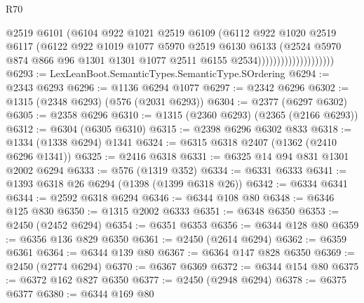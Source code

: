 \begin{lexlean}{R70}
\begin{coremodule}
                                    @2519
                                    @6101
                                    (@6104
                                      @922
                                      @1021
                                      @2519
                                      @6109
                                      (@6112
                                        @922
                                        @1020
                                        @2519
                                        @6117
                                        (@6122
                                          @922
                                          @1019
                                          @1077
                                          @5970
                                          @2519
                                          @6130
                                          @6133
                                          (@2524
                                            @5970
                                            @874
                                            @866
                                            @96
                                            @1301
                                            @1301
                                            @1077
                                            @2511
                                            @6155
                                            @2534))))))))))))))))))))
@6293 := LexLeanBoot.SemanticTypes.SemanticType.SOrdering
@6294 := @2343 @6293
@6296 := @1136 @6294 @1077
@6297 := @2342 @6296
@6302 := @1315 (@2348 @6293) (@576 (@2031 @6293))
@6304 := @2377 (@6297 @6302)
@6305 := @2358 @6296
@6310 := @1315 (@2360 @6293) (@2365 (@2166 @6293))
@6312 := @6304 (@6305 @6310)
@6315 := @2398 @6296 @6302 @833
@6318 := @1334 (@1338 @6294) @1341
@6324 := @6315 @6318 @2407 (@1362 (@2410 @6296 @1341))
@6325 := @2416 @6318
@6331 := @6325 @14 @94 @831 @1301 @2002 @6294
@6333 := @576 (@1319 @352)
@6334 := @6331 @6333
@6341 := @1393 @6318 @26 @6294 (@1398 (@1399 @6318 @26))
@6342 := @6334 @6341
@6344 := @2592 @6318 @6294
@6346 := @6344 @108 @80
@6348 := @6346 @125 @830
@6350 := @1315 @2002 @6333
@6351 := @6348 @6350
@6353 := @2450 (@2452 @6294)
@6354 := @6351 @6353
@6356 := @6344 @128 @80
@6359 := @6356 @136 @829 @6350
@6361 := @2450 (@2614 @6294)
@6362 := @6359 @6361
@6364 := @6344 @139 @80
@6367 := @6364 @147 @828 @6350
@6369 := @2450 (@2774 @6294)
@6370 := @6367 @6369
@6372 := @6344 @154 @80
@6375 := @6372 @162 @827 @6350
@6377 := @2450 (@2948 @6294)
@6378 := @6375 @6377
@6380 := @6344 @169 @80

\end{coremodule}
\end{lexlean}
